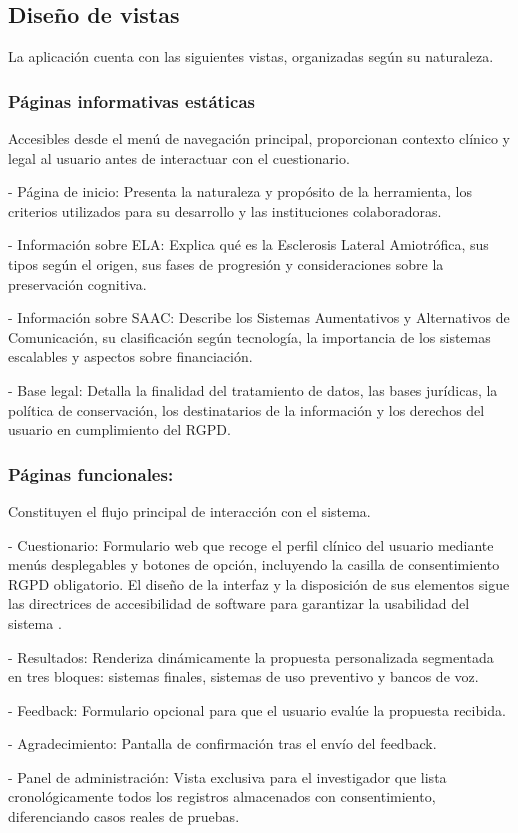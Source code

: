 \subsection{Diseño de vistas}
La aplicación cuenta con las siguientes vistas, organizadas según su naturaleza.

\subsubsection{Páginas informativas estáticas}
Accesibles desde el menú de navegación principal, proporcionan contexto clínico y legal al usuario antes de interactuar con el cuestionario.

\begin{description}
	\item - Página de inicio: Presenta la naturaleza y propósito de la herramienta, los criterios utilizados para su desarrollo y las instituciones colaboradoras.
	\item- Información sobre ELA: Explica qué es la Esclerosis Lateral Amiotrófica, sus tipos según el origen, sus fases de progresión y consideraciones sobre la preservación cognitiva. \cite{elaandalucia:guia}
	\item- Información sobre SAAC: Describe los Sistemas Aumentativos y Alternativos de Comunicación, su clasificación según tecnología, la importancia de los sistemas escalables y aspectos sobre financiación. \cite{lesturnerals:elacomunicacion}
	\item- Base legal: Detalla la finalidad del tratamiento de datos, las bases jurídicas, la política de conservación, los destinatarios de la información y los derechos del usuario en cumplimiento del RGPD. \cite{ue:rgpd}
\end{description}

\subsubsection{Páginas funcionales:}
Constituyen el flujo principal de interacción con el sistema.

\begin{description}
	\item- Cuestionario: Formulario web que recoge el perfil clínico del usuario mediante menús desplegables y botones de opción, incluyendo la casilla de consentimiento RGPD obligatorio. El diseño de la interfaz y la disposición de sus elementos sigue las directrices de 				accesibilidad de software para garantizar la usabilidad del sistema \cite{iso:9241}.
	\item- Resultados: Renderiza dinámicamente la propuesta personalizada segmentada en tres bloques: sistemas finales, sistemas de uso preventivo y bancos de voz.
	\item- Feedback: Formulario opcional para que el usuario evalúe la propuesta recibida.
	\item- Agradecimiento: Pantalla de confirmación tras el envío del feedback.		\item- Panel de administración: Vista exclusiva para el investigador que lista cronológicamente todos los registros almacenados con consentimiento, diferenciando casos reales de pruebas.
\end{description}

